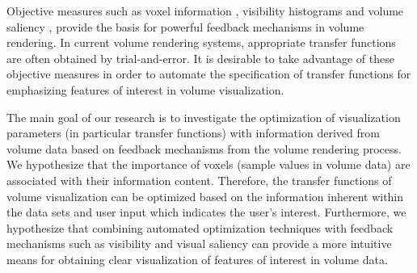 
Objective measures such as voxel information \cite{bordoloi_view_2005} \cite{wang_information_2011}, visibility histograms \cite{emsenhuber_visibility_2008} \cite{correa_visibility-driven_2009} and volume saliency \cite{kim_saliency-guided_2006}, provide the basis for powerful feedback mechanisms in volume rendering.
In current volume rendering systems, appropriate transfer functions are often obtained by trial-and-error.
It is desirable to take advantage of these objective measures in order to automate the specification of transfer functions for emphasizing features of interest in volume visualization.

The main goal of our research is to investigate the optimization of visualization parameters (in particular transfer functions) with information derived from volume data based on feedback mechanisms from the volume rendering process.
We hypothesize that the importance of voxels (sample values in volume data) are associated with their information content. Therefore, the transfer functions of volume visualization can be optimized based on the information inherent within the data sets and user input which indicates the user's interest.
Furthermore, we hypothesize that combining automated optimization techniques with feedback mechanisms such as visibility and visual saliency can provide a more intuitive means for obtaining clear visualization of features of interest in volume data.




